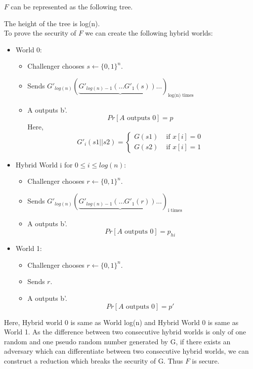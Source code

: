 \documentclass{article}
\begin{document}
\subsubsection{}
$F$ can be represented as the following tree.
\begin{center}
\end{center}
The height of the tree is log(n).\\
To prove the security of $F$ we can create the following hybrid worlds:
\begin{itemize}
        \item World 0: 
        \begin{itemize}
            \item Challenger chooses $s\leftarrow\{0,1\}^{n}$.
            \item Sends $G'_{log(n)}(\underbrace{G'_{log(n)-1}({\ldots G'_{1}(s)})\ldots})_{\text{log(n) times}}$
            \item A outputs b'.
            \[Pr[A \text{ outputs }0]=p\]
            Here,\[G'_{i}(s1||s2)=\begin{cases}
    G(s1) & \text{ if } x[i]=0 \\
    G(s2) & \text{ if } x[i]=1
\end{cases}\]
        \end{itemize}
        \item Hybrid World i for $0\leq i \leq log(n)$:
        \begin{itemize}
            \item Challenger chooses $r\leftarrow\{0,1\}^{n}$.
            \item Sends $G'_{log(n)}(\underbrace{G'_{log(n)-1}({\ldots G'_{1}(r)})\ldots})_{\text{i times}}$
            \item A outputs b'.
            \[Pr[A \text{ outputs }0]=p_{hi}\]
        \end{itemize}
        \item World 1:
        \begin{itemize}
            \item Challenger chooses $r\leftarrow\{0,1\}^{n}$.
            \item Sends $r$.
            \item A outputs b'.
            \[Pr[A \text{ outputs }0]=p'\]
        \end{itemize}
\end{itemize}
Here, Hybrid world 0 is same as World log(n) and Hybrid World 0 is same as World 1. As the difference between two consecutive hybrid worlds is only of one random and one pseudo random number generated by G, if there exists an adversary which can differentiate between two consecutive hybrid worlds, we can construct a reduction which breaks the security of G. Thus $F$ is secure. 
\end{document}
